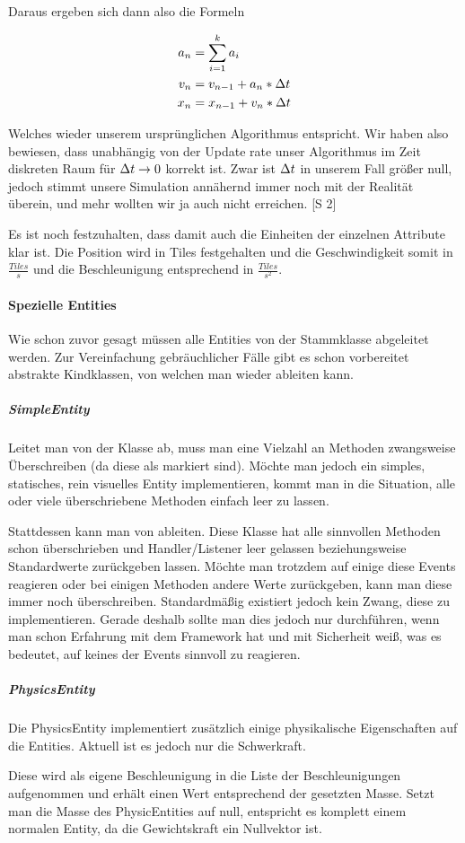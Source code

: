 Daraus ergeben sich dann also die Formeln

\begin{align*}
  a_n &= \sum_{i=1}^{k}{a_i}  \\
  v_n &= v_{n-1} + a_n * \Delta t  \\
  x_n &= x_{n-1} + v_n * \Delta t
\end{align*}

Welches wieder unserem ursprünglichen Algorithmus entspricht. Wir haben also bewiesen, dass unabhängig von der Update rate unser Algorithmus im Zeit diskreten Raum für $\Delta t \rightarrow 0$ korrekt ist. Zwar ist $\Delta t $ in unserem Fall größer null, jedoch stimmt unsere Simulation annähernd immer noch mit der Realität überein, und mehr wollten wir ja auch nicht erreichen. \cite{ACP}[S 2]

Es ist noch festzuhalten, dass damit auch die Einheiten der einzelnen Attribute klar ist. Die Position wird in Tiles festgehalten und die Geschwindigkeit somit in $\frac{Tiles}{s}$ und die Beschleunigung entsprechend in $\frac{Tiles}{s^2}$.

\paragraph{Spezielle Entities}

Wie schon zuvor gesagt müssen alle Entities von der Stammklasse  abgeleitet werden. Zur Vereinfachung gebräuchlicher Fälle gibt es schon vorbereitet abstrakte Kindklassen, von welchen man wieder ableiten kann.


\subparagraph{SimpleEntity}

Leitet man von der Klasse  ab, muss man eine Vielzahl an Methoden zwangsweise Überschreiben (da diese als  markiert sind). Möchte man jedoch ein simples, statisches, rein visuelles Entity implementieren, kommt man in die Situation, alle oder viele überschriebene Methoden einfach leer zu lassen.

Stattdessen kann man von  ableiten. Diese Klasse hat alle sinnvollen Methoden schon überschrieben und Handler/Listener leer gelassen beziehungsweise Standardwerte zurückgeben lassen. Möchte man trotzdem auf einige diese Events reagieren oder bei einigen Methoden andere Werte zurückgeben, kann man diese immer noch überschreiben. Standardmäßig existiert jedoch kein Zwang, diese zu implementieren.
Gerade deshalb sollte man dies jedoch nur durchführen, wenn man schon Erfahrung mit dem Framework hat und mit Sicherheit weiß, was es bedeutet, auf keines der Events sinnvoll zu reagieren.

\subparagraph{PhysicsEntity}

Die PhysicsEntity implementiert zusätzlich einige physikalische Eigenschaften auf die Entities. Aktuell ist es jedoch nur die Schwerkraft.

Diese wird als eigene Beschleunigung in die Liste der Beschleunigungen aufgenommen und erhält einen Wert entsprechend der gesetzten Masse. Setzt man die Masse des PhysicEntities auf null, entspricht es komplett einem normalen Entity, da die Gewichtskraft ein Nullvektor ist.